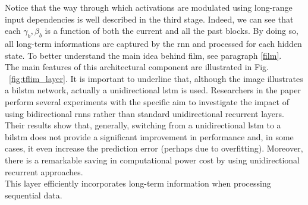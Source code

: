 \noindent Notice that the way through which activations are modulated using long-range input dependencies is well described in the third stage. Indeed, we can see that each $\gamma_{b}, \beta_{b}$ is a function of both the current and all the past blocks. By doing so, all long-term informations are captured by the \gls{rnn} and processed for each hidden state. To better understand the main idea behind \gls{film}, see paragraph \ref{film}. \\
The main features of this architectural component are illustrated in Fig. ~\ref{fig:tflim_layer}. It is important to underline that, although the image illustrates a \gls{bilstm} network, actually a unidirectional \gls{lstm} is used. Researchers in the paper perform several experiments with the specific aim to investigate the impact of using bidirectional \gls{rnn}s rather than standard unidirectional recurrent layers. Their results show that, generally, switching from a unidirectional \gls{lstm} to a \gls{bilstm} does not provide a significant improvement in performance and, in some cases, it even increase the prediction error (perhaps due to overfitting). Moreover, there is a remarkable saving in computational power cost by using unidirectional recurrent approaches. \\
This layer efficiently incorporates long-term information when processing sequential data. \\                                       

